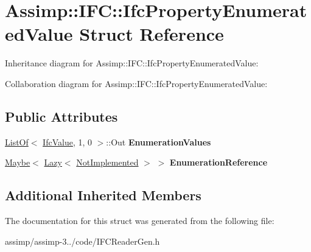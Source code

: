 \hypertarget{struct_assimp_1_1_i_f_c_1_1_ifc_property_enumerated_value}{\section{Assimp\+:\+:I\+F\+C\+:\+:Ifc\+Property\+Enumerated\+Value Struct Reference}
\label{struct_assimp_1_1_i_f_c_1_1_ifc_property_enumerated_value}
}


Inheritance diagram for Assimp\+:\+:I\+F\+C\+:\+:Ifc\+Property\+Enumerated\+Value\+:


Collaboration diagram for Assimp\+:\+:I\+F\+C\+:\+:Ifc\+Property\+Enumerated\+Value\+:
\subsection*{Public Attributes}
\begin{DoxyCompactItemize}
\item 
\hypertarget{struct_assimp_1_1_i_f_c_1_1_ifc_property_enumerated_value_a33cb60c585c05bfc5df0ae6ea9d3b7a5}{\hyperlink{struct_assimp_1_1_s_t_e_p_1_1_list_of}{List\+Of}$<$ \hyperlink{class_assimp_1_1_s_t_e_p_1_1_e_x_p_r_e_s_s_1_1_data_type}{Ifc\+Value}, 1, 0 $>$\+::Out {\bfseries Enumeration\+Values}}\label{struct_assimp_1_1_i_f_c_1_1_ifc_property_enumerated_value_a33cb60c585c05bfc5df0ae6ea9d3b7a5}

\item 
\hypertarget{struct_assimp_1_1_i_f_c_1_1_ifc_property_enumerated_value_a44776daddcaf501cf32ff740db1e2843}{\hyperlink{struct_assimp_1_1_s_t_e_p_1_1_maybe}{Maybe}$<$ \hyperlink{struct_assimp_1_1_s_t_e_p_1_1_lazy}{Lazy}$<$ \hyperlink{struct_assimp_1_1_i_f_c_1_1_not_implemented}{Not\+Implemented} $>$ $>$ {\bfseries Enumeration\+Reference}}\label{struct_assimp_1_1_i_f_c_1_1_ifc_property_enumerated_value_a44776daddcaf501cf32ff740db1e2843}

\end{DoxyCompactItemize}
\subsection*{Additional Inherited Members}


The documentation for this struct was generated from the following file\+:\begin{DoxyCompactItemize}
\item 
assimp/assimp-\/3../code/I\+F\+C\+Reader\+Gen.\+h\end{DoxyCompactItemize}
